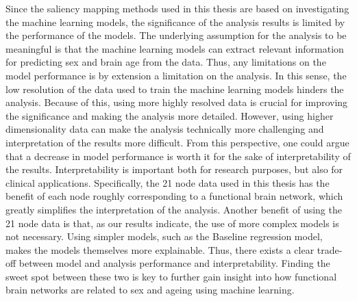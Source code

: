 Since the saliency mapping methods used in this thesis are based on investigating the machine learning models, the significance of the analysis results is limited by the performance of the models. The underlying assumption for the analysis to be meaningful is that the machine learning models can extract relevant information for predicting sex and brain age from the data. Thus, any limitations on the model performance is by extension a limitation on the analysis. In this sense, the low resolution of the data used to train the machine learning models hinders the analysis. Because of this, using more highly resolved data is crucial for improving the significance and making the analysis more detailed. However, using higher dimensionality data can make the analysis technically more challenging and interpretation of the results more difficult. From this perspective, one could argue that a decrease in model performance is worth it for the sake of interpretability of the results. Interpretability is important both for research purposes, but also for clinical applications. Specifically, the 21 node data used in this thesis has the benefit of each node roughly corresponding to a functional brain network, which greatly simplifies the interpretation of the analysis. Another benefit of using the 21 node data is that, as our results indicate, the use of more complex models is not necessary. Using simpler models, such as the Baseline regression model, makes the models themselves more explainable. Thus, there exists a clear trade-off between model and analysis performance and interpretability. Finding the sweet spot between these two is key to further gain insight into how functional brain networks are related to sex and ageing using machine learning. 
















